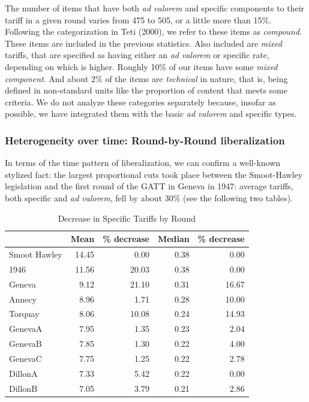 \documentclass[
  12pt,
]{article}
\begin{document}
The number of items that have both \emph{ad valorem} and specific components to their tariff in a given round varies from 475 to 505, or a little more than 15\%. Following the categorization in Teti (2000), we refer to these items as \emph{compound}. These items are included in the previous statistics. Also included are \emph{mixed} tariffs, that are specified as having either an \emph{ad valorem} or specific rate, depending on which is higher. Roughly 10\% of our items have some \emph{mixed component}. And about 2\% of the items are \emph{technical} in nature, that is, being defined in non-standard units like the proportion of content that meets some criteria. We do not analyze these categories separately because, insofar as possible, we have integrated them with the basic \emph{ad valorem} and specific types.

\hypertarget{heterogeneity-over-time-round-by-round-liberalization}{%
\subsubsection{Heterogeneity over time: Round-by-Round liberalization}\label{heterogeneity-over-time-round-by-round-liberalization}}

In terms of the time pattern of liberalization, we can confirm a well-known stylized fact: the largest proportional cuts took place between the Smoot-Hawley legislation and the first round of the GATT in Geneva in 1947: average tariffs, both specific and \emph{ad valorem}, fell by about 30\% (see the following two tables).

\begin{table}[!h]

\caption{\label{tab:sp-rd}Decrease in Specific Tariffs by Round}
\centering
\begin{tabular}[t]{lrrrr}
\toprule
  & Mean & \% decrease & Median & \% decrease\\
\midrule
Smoot Hawley & 14.45 & 0.00 & 0.38 & 0.00\\
1946 & 11.56 & 20.03 & 0.38 & 0.00\\
Geneva & 9.12 & 21.10 & 0.31 & 16.67\\
Annecy & 8.96 & 1.71 & 0.28 & 10.00\\
Torquay & 8.06 & 10.08 & 0.24 & 14.93\\
\addlinespace
GenevaA & 7.95 & 1.35 & 0.23 & 2.04\\
GenevaB & 7.85 & 1.30 & 0.22 & 4.00\\
GenevaC & 7.75 & 1.25 & 0.22 & 2.78\\
DillonA & 7.33 & 5.42 & 0.22 & 0.00\\
DillonB & 7.05 & 3.79 & 0.21 & 2.86\\
\bottomrule
\end{tabular}
\end{table}
\end{document}
